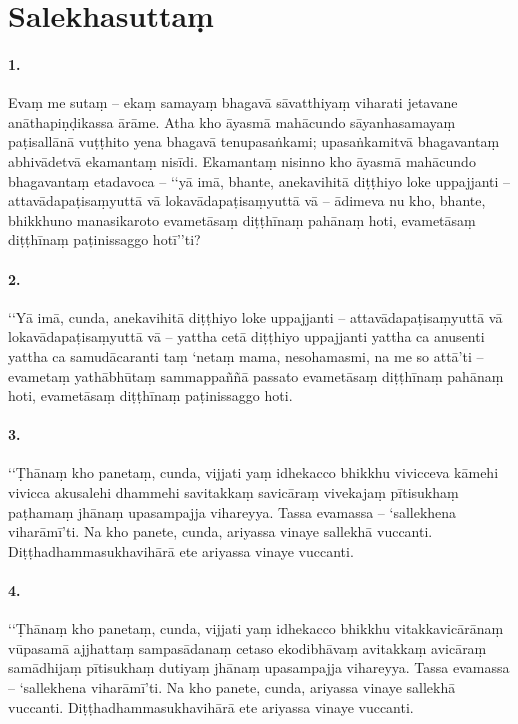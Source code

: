 \section{Salekhasuttaṃ}

\paragraph{1.} Evaṃ me sutaṃ – ekaṃ samayaṃ bhagavā sāvatthiyaṃ viharati jetavane anāthapiṇḍikassa ārāme. Atha kho āyasmā mahācundo sāyanhasamayaṃ paṭisallānā vuṭṭhito yena bhagavā tenupasaṅkami; upasaṅkamitvā bhagavantaṃ abhivādetvā ekamantaṃ nisīdi. Ekamantaṃ nisinno kho āyasmā mahācundo bhagavantaṃ etadavoca – ‘‘yā imā, bhante, anekavihitā diṭṭhiyo loke uppajjanti – attavādapaṭisaṃyuttā vā lokavādapaṭisaṃyuttā vā – ādimeva nu kho, bhante, bhikkhuno manasikaroto evametāsaṃ diṭṭhīnaṃ pahānaṃ hoti, evametāsaṃ diṭṭhīnaṃ paṭinissaggo hotī’’ti?

\paragraph{2.} ‘‘Yā imā, cunda, anekavihitā diṭṭhiyo loke uppajjanti – attavādapaṭisaṃyuttā vā lokavādapaṭisaṃyuttā vā – yattha cetā diṭṭhiyo uppajjanti yattha ca anusenti yattha ca samudācaranti taṃ ‘netaṃ mama, nesohamasmi, na me so attā’ti – evametaṃ yathābhūtaṃ sammappaññā passato evametāsaṃ diṭṭhīnaṃ pahānaṃ hoti, evametāsaṃ diṭṭhīnaṃ paṭinissaggo hoti.

\paragraph{3.} ‘‘Ṭhānaṃ kho panetaṃ, cunda, vijjati yaṃ idhekacco bhikkhu vivicceva kāmehi vivicca akusalehi dhammehi savitakkaṃ savicāraṃ vivekajaṃ pītisukhaṃ paṭhamaṃ jhānaṃ upasampajja vihareyya. Tassa evamassa – ‘sallekhena viharāmī’ti. Na kho panete, cunda, ariyassa vinaye sallekhā vuccanti. Diṭṭhadhammasukhavihārā ete ariyassa vinaye vuccanti.

\paragraph{4.} ‘‘Ṭhānaṃ kho panetaṃ, cunda, vijjati yaṃ idhekacco bhikkhu vitakkavicārānaṃ vūpasamā ajjhattaṃ sampasādanaṃ cetaso ekodibhāvaṃ avitakkaṃ avicāraṃ samādhijaṃ pītisukhaṃ dutiyaṃ jhānaṃ upasampajja vihareyya. Tassa evamassa – ‘sallekhena viharāmī’ti. Na kho panete, cunda, ariyassa vinaye sallekhā vuccanti. Diṭṭhadhammasukhavihārā ete ariyassa vinaye vuccanti.

